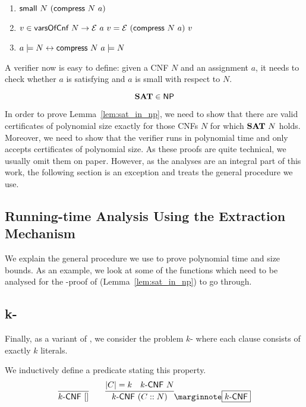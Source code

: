\begin{lemma}\leavevmode
  \begin{enumerate}
    \item $\textsf{small}~N~(\textsf{compress}~N~a)$
    \item $v \in \textsf{varsOfCnf}~N \rightarrow \mathcal{E}~a~v = \mathcal{E}~(\textsf{compress}~N~a)~v$
    \item $a \models N \leftrightarrow \textsf{compress}~N~a \models N$
  \end{enumerate}
\end{lemma}

A verifier now is easy to define: given a CNF $N$ and an assignment $a$, it needs to check whether $a$ is satisfying and $a$ is small with respect to $N$. 

\begin{lemma}[\SAT{} is in \NP{}]\label{lem:sat_in_np}
  \[\textbf{SAT}{} \in \textsf{NP}{} \]
\end{lemma}

In order to prove Lemma~\ref{lem:sat_in_np}, we need to show that there are valid certificates of polynomial size exactly for those CNFs $N$ for which $\textbf{SAT}{}~N$ holds. 
Moreover, we need to show that the verifier runs in polynomial time and only accepts certificates of polynomial size. 
As these proofs are quite technical, we usually omit them on paper. However, as the analyses are an integral part of this work, the following section is an exception and treats the general procedure we use.

\subsection{Running-time Analysis Using the Extraction Mechanism}
  We explain the general procedure we use to prove polynomial time and size bounds. 
  As an example, we look at some of the functions which need to be analysed for the \NP{}-proof of \SAT{} (Lemma~\ref{lem:sat_in_np}) to go through. 

\newcommand{\kCNF}[1]{\text{$#1$-\textsf{CNF}}}
\subsection{k-\SAT{}}
Finally, as a variant of \SAT{}, we consider the problem $k$-\SAT{} where each clause consists of exactly $k$ literals. 

We inductively define a predicate stating this property.
\begin{align*}
  \infer{\kCNF{k}~\nil}{} \qquad \infer{\kCNF{k}~(C :: N)}{\length{C} = k \quad \kCNF{k}~N}\mnote{\kCNF{k}}
\end{align*}

